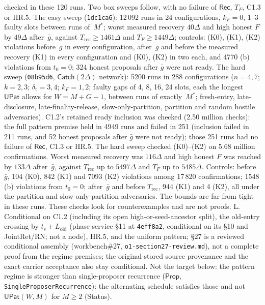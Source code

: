\documentclass{article}
\begin{document}
{checked in these 120 runs.  Two box sweeps follow, with no failure of
$\mathsf{Rec}$, $T_F$, C1.3 or HR.5.  The easy sweep (\texttt{1dc1ca6}):
12\,092 runs in 24 configurations, $k_F=0$, 1--3 faulty slots between runs
of~$M^*$; worst measured recovery $40\Delta$ and high honest $F$ by $49\Delta$
after~$\bar g$, against $T_{\mathrm{rec}}\geq1461\Delta$ and
$T_F\geq1449\Delta$; controls: (K0), (K1), (K2) violations before~$\bar g$ in
every configuration, after~$\bar g$ and before the measured recovery (K1) in
every configuration and (K0), (K2) in two each, and 4770 (b) violations from
$t_0=0$; 324 honest proposals after $\bar g$ were not ready.  The hard sweep
(\texttt{08b95d6}, $\mathsf{Catch}(2\Delta)$ network): 5200 runs in 288
configurations ($n=4,7$; $k=2,3$; $\delta_{\mathrm t}=3,4$; $k_F=1,2$; faulty
gaps of 4, 8, 16, 24 slots, each the longest $\mathsf{UPat}$ allows for
$W=M+G-1$, between runs of exactly~$M^*$; fresh-entry, late-disclosure,
late-finality-release, slow-only-partition, partition and random hostile
adversaries).  C1.2's retained ready inclusion was checked (2.50 million
checks): the full pattern premise held in 4949 runs and failed in 251
(inclusion failed in 211 runs, and 52 honest proposals after $\bar g$ were not
ready); those 251 runs had no failure of $\mathsf{Rec}$, C1.3 or HR.5.  The
hard sweep checked (K0)--(K2) on 5.68 million confirmations.  Worst measured
recovery was $116\Delta$ and high honest $F$ was reached by $133\Delta$
after~$\bar g$, against $T_{\mathrm{rec}}$ up to $5497\Delta$ and $T_F$ up to
$5485\Delta$.  Controls: before~$\bar g$, 104 (K0), 842 (K1) and 7093 (K2)
violations among 17\,820 confirmations; 1548 (b) violations from $t_0=0$;
after~$\bar g$ and before $T_{\mathrm{rec}}$, 944 (K1) and 4 (K2), all under
the partition and slow-only-partition adversaries.  The bounds are far from
tight in these runs.  These checks look for counterexamples and are not proofs.}
{L.  Conditional on C1.2 (including its open high-or-seed-ancestor split), the
old-entry crossing by $t_s+L_{\mathrm{old}}$ (phase-service \S11 at
\texttt{4eff8a2}, conditional on its \S10 and JointRet/RN; not a node), HR.5,
and the uniform pattern; \S27 is a reviewed conditional assembly
(workbench\#27, \texttt{o1-section27-review.md}), not a complete proof from the
regime premises; the original-stored source provenance and the exact carrier
acceptance also stay conditional.  Not the
target below: the pattern regime is stronger than single-proposer recurrence
($\mathsf{Prop}$, \texttt{SingleProposerRecurrence}): the alternating schedule
satisfies those and not $\mathsf{UPat}(W,M)$ for $M\geq2$ (Status).}
\end{document}
